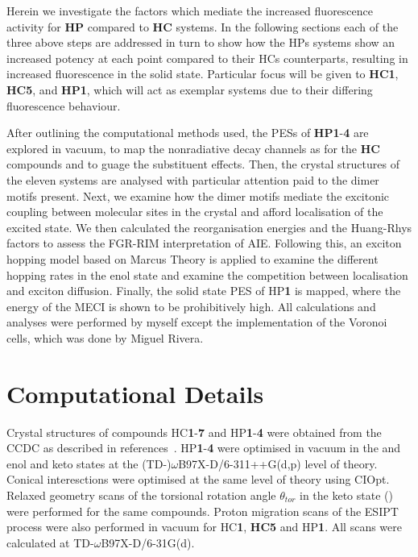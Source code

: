 Herein we investigate the factors which mediate the increased fluorescence activity for \textbf{HP} compared to \textbf{HC} systems. In the following sections each of the three above steps are addressed in turn to show how the \acp{HP} systems show an increased potency at each point compared to their \acp{HC} counterparts, resulting in increased fluorescence in the solid state. Particular focus will be given to \textbf{HC1}, \textbf{HC5}, and \textbf{HP1}, which will act as exemplar systems due to their differing fluorescence behaviour.

After outlining the computational methods used, the \acp{PES} of \textbf{HP1}-\textbf{4} are explored in vacuum, to map the nonradiative decay channels as for the \textbf{HC} compounds and to guage the substituent effects. Then, the crystal structures of the eleven systems are analysed with particular attention paid to the dimer motifs present. Next, we examine how the dimer motifs mediate the excitonic coupling between molecular sites in the crystal and afford localisation of the excited state. We then calculated the reorganisation energies and the Huang-Rhys factors to assess the \ac{FGR-RIM} interpretation of \ac{AIE}. Following this, an exciton hopping model based on Marcus Theory is applied to examine the different hopping rates in the enol state and examine the competition between localisation and exciton diffusion. Finally, the solid state \ac{PES}  of \ac{HP}\textbf{1} is mapped, where the energy of the \ac{MECI} is shown to be prohibitively high. All calculations and analyses were performed by myself except the implementation of the Voronoi cells, which was done by Miguel Rivera.

\section{Computational Details}\label{section: Connecting_Comp}
Crystal structures of compounds \ac{HC}\textbf{1}-\textbf{7} and \ac{HP}\textbf{1}-\textbf{4} were obtained from the CCDC as described in references{~}. \ac{HP}\textbf{1}-\textbf{4} were optimised in vacuum in the \szero{} and \sone{} enol and keto states at the (TD-)$\omega$B97X-D/6-311++G(d,p) level of theory. Conical interesctions were optimised at the same level of theory using CIOpt. Relaxed geometry scans of the torsional rotation angle $\theta_{tor}$ in the keto \sone{} state (\Kstar) were performed for the same compounds. Proton migration scans of the ESIPT process were also performed in vacuum for \ac{HC}\textbf{1}, \textbf{HC5} and \ac{HP}\textbf{1}. All scans were calculated at TD-$\omega$B97X-D/6-31G(d). 

